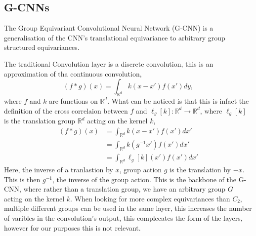 \subsection{G-CNNs}
The Group Equivariant Convolutional Neural Network (G-CNN) is a generalisation of the CNN's translational equivariance to arbitrary group structured equivariances.

The traditional Convolution layer is a discrete convolution, this is an approximation of tha continuous convolution,
\begin{equation}
	(f*g)(x) = \int_{\mathbb{R}^d} k(x-x')f(x')dy,
\end{equation}
where $f$ and $k$ are functions on $\mathbb{R}^d$. What can be noticed is that this is infact the definition of the cross correlaion between $f$ and $\ell_g[k]:  \mathbb{R}^d  \rightarrow \mathbb{R}^d$, where $\ell_g[k]$
is the translation group $\mathbb{R}^d$ acting on the kernel $k$,
\begin{align}
	(f*g)(x) & = \int_{\mathbb{R}^d} k(x-x')f(x')dx'       \\
	         & = \int_{\mathbb{R}^d} k(g^{-1}x')f(x')dx'   \\
	         & = \int_{\mathbb{R}^d} \ell_g[k](x')f(x')dx'
\end{align}
Here, the inverse of a tranlastion by $x$, group action $g$ is the translation by $-x$. This is then $g^{-1}$, the inverse of the group action. This is the backbone of the G-CNN\cite{cohen2016group}, where rather than a translation group, we have an arbitrary group $G$ acting on the kernel $k$. When looking for more complex equivariances than $C_2$, multiple different groups can be used in the same layer, this increases the number of varibles in the convolution's output, this complecates the form of the layers, however for our purposes this is not relevant.

